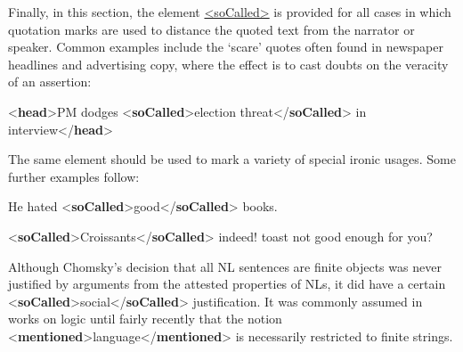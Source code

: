 Finally, in this section, the element \hyperref[TEI.soCalled]{<soCalled>} is provided for all cases in which quotation marks are used to distance the quoted text from the narrator or speaker. Common examples include the ‘scare’ quotes often found in newspaper headlines and advertising copy, where the effect is to cast doubts on the veracity of an assertion: \par\bgroup{}\exampleFont \begin{shaded}\noindent\mbox{}{<\textbf{head}>}PM dodges {<\textbf{soCalled}>}election threat{</\textbf{soCalled}>} in interview{</\textbf{head}>}\end{shaded}\egroup\par \par
The same element should be used to mark a variety of special ironic usages. Some further examples follow: \par\bgroup{}\exampleFont \begin{shaded}\noindent\mbox{}He hated {<\textbf{soCalled}>}good{</\textbf{soCalled}>} books.\end{shaded}\egroup\par \noindent  \par\bgroup{}\exampleFont \begin{shaded}\noindent\mbox{}{<\textbf{soCalled}>}Croissants{</\textbf{soCalled}>} indeed! toast not good enough for you?\end{shaded}\egroup\par \noindent   \par\bgroup{}\exampleFont \begin{shaded}\noindent\mbox{}Although Chomsky's decision that all NL\mbox{}\newline 
 sentences are finite objects was never justified by arguments from\mbox{}\newline 
 the attested properties of NLs, it did have a certain\mbox{}\newline 
{<\textbf{soCalled}>}social{</\textbf{soCalled}>} justification. It was commonly assumed in\mbox{}\newline 
 works on logic until fairly recently that the notion\mbox{}\newline 
{<\textbf{mentioned}>}language{</\textbf{mentioned}>} is necessarily restricted to finite\mbox{}\newline 
 strings.\end{shaded}\egroup\par 
